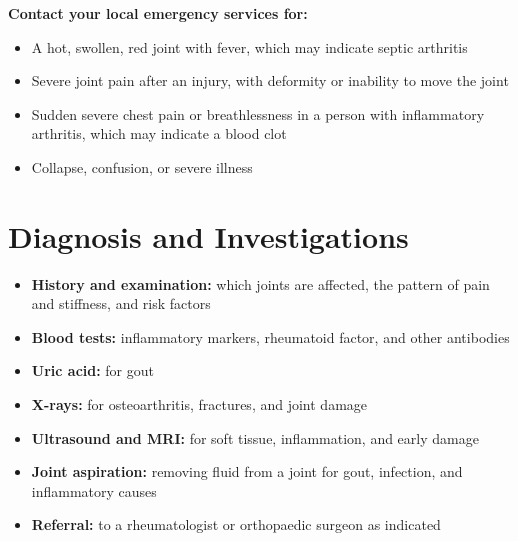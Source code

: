 \textbf{Contact your local emergency services for:}
\begin{itemize}
    \item A hot, swollen, red joint with fever, which may indicate septic arthritis
    \item Severe joint pain after an injury, with deformity or inability to move the joint
    \item Sudden severe chest pain or breathlessness in a person with inflammatory arthritis, which may indicate a blood clot
    \item Collapse, confusion, or severe illness
\end{itemize}

\section*{Diagnosis and Investigations}
\begin{itemize}
    \item \textbf{History and examination:} which joints are affected, the pattern of pain and stiffness, and risk factors
    \item \textbf{Blood tests:} inflammatory markers, rheumatoid factor, and other antibodies
    \item \textbf{Uric acid:} for gout
    \item \textbf{X-rays:} for osteoarthritis, fractures, and joint damage
    \item \textbf{Ultrasound and MRI:} for soft tissue, inflammation, and early damage
    \item \textbf{Joint aspiration:} removing fluid from a joint for gout, infection, and inflammatory causes
    \item \textbf{Referral:} to a rheumatologist or orthopaedic surgeon as indicated
\end{itemize}

